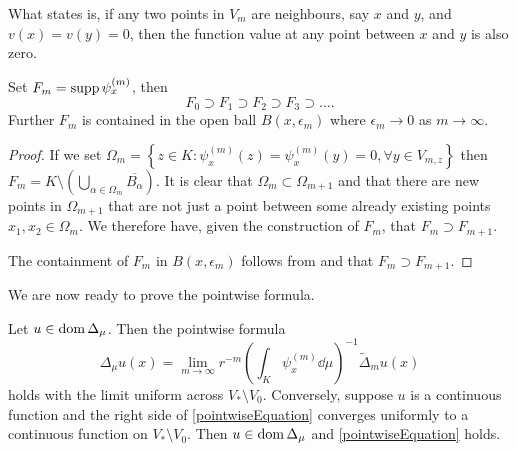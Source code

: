 What  states is, if any two points in $V_m$ are neighbours, say $x$ and $y$, and $v(x)=v(y)=0$, then the function value at any point between $x$ and $y$ is also zero.

\medskip
\begin{lemma}\label{FmSmaller}
	Set $F_m = \operatorname{supp} \psi_{x}^{(m)}$, then
	\begin{equation}
		F_0 \supset F_1 \supset F_2 \supset F_3 \supset \dots.
	\end{equation}
	Further $F_m$ is contained in the open ball $B(x, \epsilon_m)$ where $\epsilon_m \to 0$ as $m \to \infty$.
\end{lemma}

\begin{proof}
	If we set $\Omega_m = \left\{z \in K : \psi_{x}^{(m)}(z) = \psi_{x}^{(m)}(y) = 0, \forall y \in V_{m,z}  \right\}$ then $F_m = K \setminus \left(\bigcup_{\alpha \in \Omega_m} \overline{B_\alpha} \right)$. It is clear that $\Omega_m \subset \Omega_{m+1}$ and that there are new points in $\Omega_{m+1}$ that are not just a point between some already existing points $x_1, x_2 \in \Omega_m$. We therefore have, given the construction of $F_m$, that $F_m \supset F_{m+1}$.
	
	The containment of $F_m$ in $B(x, \epsilon_m)$ follows from  and that $F_m \supset F_{m+1}$.
\end{proof}

We are now ready to prove the pointwise formula.

\medskip
\begin{theorem} \label{pointwiseFormula}
	Let $u \in \operatorname{dom} \Delta_{\mu}$. Then the pointwise formula
	\begin{equation}\label{pointwiseEquation}
		\Delta_{\mu} u(x) = \lim_{m \to \infty} r^{-m} \left(\int_{K} \psi_x^{(m)} \dd \mu \right)^{-1} \widetilde{\Delta}_m u(x)
	\end{equation}
	holds with the limit uniform across $V_* \setminus V_0$. Conversely, suppose $u$ is a continuous function and the right side of \eqref{pointwiseEquation} converges uniformly to a continuous function on $V_* \setminus V_0$. Then $u \in \operatorname{dom} \Delta_{\mu}$ and \eqref{pointwiseEquation} holds.
\end{theorem}

